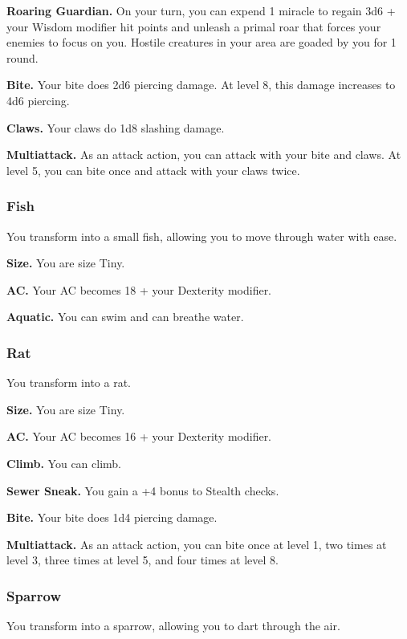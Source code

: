 \documentclass[12pt,letterpaper,twocolumn,openany,nodeprecatedcode,bg=none]{dndbook}
\begin{document}
\textbf{Roaring Guardian.} On your turn, you can expend 1 miracle to
regain 3d6 + your Wisdom modifier hit points and unleash a primal roar
that forces your enemies to focus on you. Hostile creatures in your area
are goaded by you for 1 round.

\textbf{Bite.} Your bite does 2d6 piercing damage. At level 8, this
damage increases to 4d6 piercing.

\textbf{Claws.} Your claws do 1d8 slashing damage.

\textbf{Multiattack.} As an attack action, you can attack with your bite
and claws. At level 5, you can bite once and attack with your claws
twice.

\subsubsection{Fish}\label{fish}

You transform into a small fish, allowing you to move through water with
ease.

\textbf{Size.} You are size Tiny.

\textbf{AC.} Your AC becomes 18 + your Dexterity modifier.

\textbf{Aquatic.} You can swim and can breathe water.

\subsubsection{Rat}\label{rat}

You transform into a rat.

\textbf{Size.} You are size Tiny.

\textbf{AC.} Your AC becomes 16 + your Dexterity modifier.

\textbf{Climb.} You can climb.

\textbf{Sewer Sneak.} You gain a +4 bonus to Stealth checks.

\textbf{Bite.} Your bite does 1d4 piercing damage.

\textbf{Multiattack.} As an attack action, you can bite once at level 1,
two times at level 3, three times at level 5, and four times at level 8.

\subsubsection{Sparrow}\label{sparrow}

You transform into a sparrow, allowing you to dart through the air.
\end{document}
